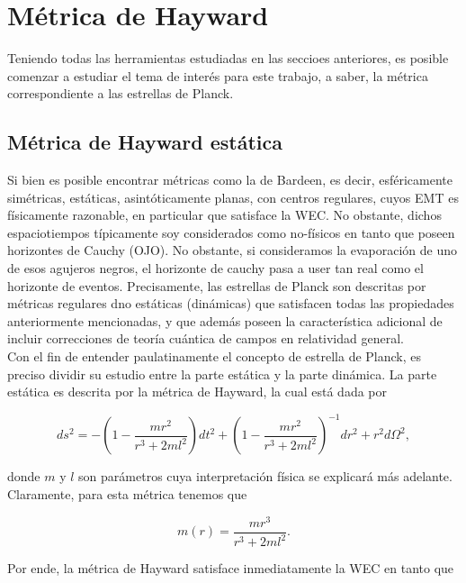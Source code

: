 \documentclass{article}
\numberwithin{equation}{section}
\theoremstyle{definition}
\begin{document}
\section{\label{planck stars section} Métrica de Hayward}

Teniendo todas las herramientas estudiadas en las seccioes anteriores, es posible comenzar a estudiar el tema de interés para este trabajo, a saber, la métrica correspondiente a las estrellas de Planck.

\subsection{Métrica de Hayward estática}

Si bien es posible encontrar métricas como la de Bardeen, es decir, esféricamente simétricas, estáticas, asintóticamente planas, con centros regulares, cuyos EMT es físicamente razonable, en particular que satisface la WEC. No obstante, dichos espaciotiempos típicamente soy considerados como no-físicos en tanto que poseen horizontes de Cauchy (OJO). No obstante, si consideramos la evaporación de uno de esos agujeros negros, el horizonte de cauchy pasa a user tan real como el horizonte de eventos.  Precisamente, las estrellas de Planck son descritas por métricas regulares dno estáticas (dinámicas) que satisfacen todas las propiedades anteriormente mencionadas, y que además poseen la característica adicional de incluir correcciones de teoría cuántica de campos en relatividad general.\\

Con el fin de entender paulatinamente el concepto de estrella de Planck, es preciso dividir su estudio entre la parte estática y la parte dinámica. La parte estática es descrita por la métrica de Hayward, la cual está dada por 

\begin{equation}
\label{hayward metric}
ds^2 = -\left( 1 - \frac{mr^2}{r^3 + 2ml^2} \right) dt^2 + \left( 1 - \frac{mr^2}{r^3 + 2ml^2} \right)^{-1} dr^2 + r^2d\Omega ^2,
\end{equation}

donde $m$ y $l$ son parámetros cuya interpretación física se explicará más adelante. Claramente, para esta métrica tenemos que

\begin{equation}
\label{hayward mass}
m(r) =  \frac{mr^3}{r^3 + 2ml^2}.
\end{equation}

Por ende, la métrica de Hayward satisface inmediatamente la WEC en tanto que 
\end{document}

